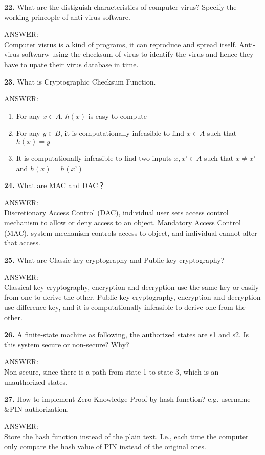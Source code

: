 \documentclass[paper=a4, fontsize=11pt]{scrartcl} %
\numberwithin{equation}{section} %
\numberwithin{figure}{section} %
\numberwithin{table}{section} %
\begin{document}
\textbf{22.} What are the distiguish characteristics of computer virus? Specify the working princople of anti-virus software.

ANSWER:\\
Computer visrus is a kind of programs, it can reproduce and spread itself. Anti-virus softwarw using the checksum of virus to identify the virus and hence they have to upate their virus database in time. 

\textbf{23.} What is Cryptographic Checksum Function.

ANSWER:
\begin{enumerate}
\item For any $x\in A$, $h(x)$ is easy to compute
\item For any $y\in B$, it is computationally infeasible to find $x \in A$ such that $h(x) = y$
\item It is computationally infeasible to find two inputs $x, x’ \in A$  such that $x ≠ x’$ and $h(x) = h(x’)$
\end{enumerate}

\textbf{24.} What are MAC and DAC？

ANSWER: \\
Discretionary Access Control (DAC), individual user sets access control mechanism to allow or deny access to an object. Mandatory Access Control (MAC), system mechanism controls access to object, and individual cannot alter that access.

\textbf{25.} What are Classic key cryptography and Public key cryptography?

ANSWER: \\
Classical key cryptography, encryption and decryption use the same key or easily from one to derive the other. Public key cryptography, encryption and decryption use difference key, and it is computationally infeasible to derive one from the other.

\textbf{26.} A finite-state machine as following, the authorized states are s1 and s2. Is this system secure or non-secure? Why? 
 
ANSWER: \\
Non-secure, since there is a path from state 1 to state 3, which is an unauthorized states.

\textbf{27.} How to implement Zero Knowledge Proof by hash function? e.g. username &PIN authorization.

ANSWER: \\
Store the hash function instead of the plain text. I.e., each time the computer only compare the hash value of PIN instead of the original ones.
\end{document}
